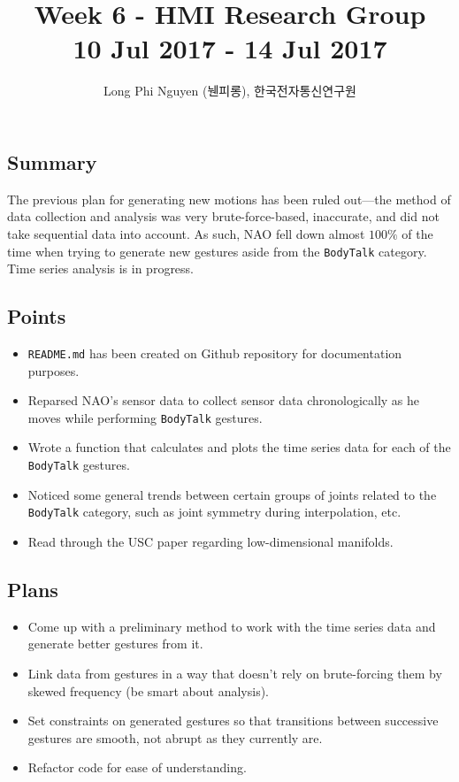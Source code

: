 \documentclass{article}
\title{Week 6 - HMI Research Group \\ \large 10 Jul 2017 - 14 Jul 2017}
\author{Long Phi Nguyen (뉀피롱), 한국전자통신연구원}
\begin{document}
  \maketitle


  \subsection*{Summary} The previous plan for generating new motions has been ruled out---the method of data collection and analysis
  was very brute-force-based, inaccurate, and did not take sequential data into account.
  As such, NAO fell down almost $100\%$ of the time when trying to generate
  new gestures aside from the \verb|BodyTalk| category. Time series analysis is in progress.

  \subsection*{Points}
  \begin{itemize}
    \item \verb|README.md| has been created on Github repository for documentation purposes.
    \item Reparsed NAO's sensor data to collect sensor data chronologically as he moves while performing \verb|BodyTalk| gestures.
    \item Wrote a function that calculates and plots the time series data for each of the \verb|BodyTalk| gestures.
    \item Noticed some general trends between certain groups of joints related to the \verb|BodyTalk| category, such as
          joint symmetry during interpolation, etc.
    \item Read through the USC paper regarding low-dimensional manifolds.
  \end{itemize}

  \subsection*{Plans}
  \begin{itemize}
    \item Come up with a preliminary method to work with the time series data and generate better gestures from it.
    \item Link data from gestures in a way that doesn't rely on brute-forcing them by skewed frequency (be smart about analysis).
    \item Set constraints on generated gestures so that transitions between successive gestures are smooth, not abrupt as they currently are.
    \item Refactor code for ease of understanding.
  \end{itemize}
\end{document}
